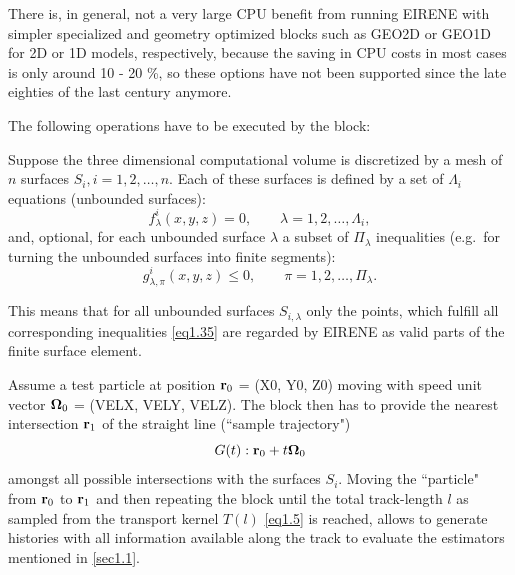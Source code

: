 There is, in general, not a very large CPU benefit from running EIRENE with
simpler specialized and geometry optimized blocks such as GEO2D or GEO1D for 2D
or 1D models, respectively, because the saving in CPU costs in most cases is
only around 10 - 20 \%, so these options have not been supported since the late
eighties of the last century anymore.


The following operations have to be executed by the block:

Suppose the three dimensional computational volume is discretized by a mesh of
$n$ surfaces \mbox{$S_i, i = 1, 2, \dots, n$}.
Each of these surfaces is defined by a set of $\Lambda_i$ equations (unbounded
surfaces):
\begin{equation}
  f_{\lambda}^i (x,y,z) = 0 ,	 \quad \quad \lambda =
  1, 2, \dots, \Lambda_i , \label{eq1.34}
\end{equation}
and, optional, for each unbounded surface $\lambda$  a subset of $
  \Pi_{\lambda}
$ inequalities (e.g.\ for turning the unbounded surfaces into finite segments):
\begin{equation}
  g_{\lambda, \pi}^i (x,y,z)  \le   0 ,    \quad \quad \pi =
  1, 2, \dots, \Pi_{\lambda} . \label{eq1.35}
\end{equation}

This means that for all unbounded surfaces $S_{i,\lambda}$ only the points,
which fulfill all corresponding inequalities \cref{eq1.35} are regarded by
EIRENE as valid parts of the finite surface element.

Assume a test particle at position $\mathbf{r}_0$ = (X0, Y0, Z0) moving with speed
unit vector $\mathbf{\Omega}_0$ = (VELX, VELY, VELZ).
The block then has to provide the nearest intersection $\mathbf{r}_1$ of the straight
line (``sample trajectory")
\begin{equation}
  \nonumber G(t):
  \mathbf{r}_0 + t \mathbf{\Omega}_0
\end{equation}
amongst all possible intersections with the surfaces $S_i$.
Moving the ``particle" from $\mathbf{r}_0$ to $\mathbf{r}_1$ and then repeating the block
until the total track-length $l$ as sampled from the transport kernel $T(l)$
\cref{eq1.5} is reached, allows to generate histories with all information
available along the track to evaluate the estimators mentioned in
\cref{sec1.1}.

